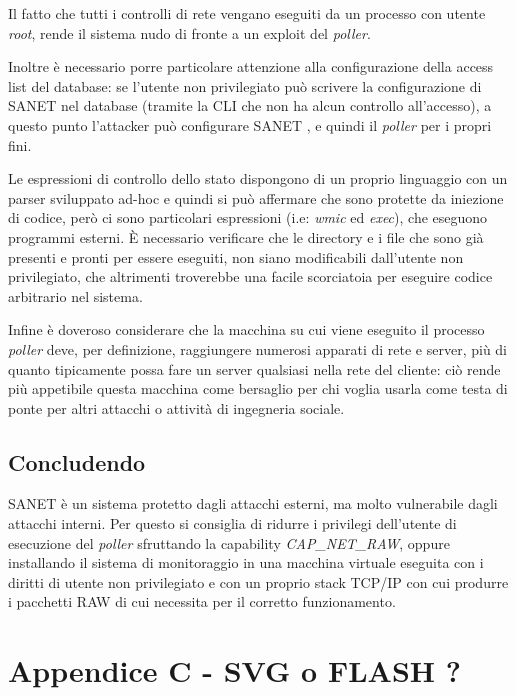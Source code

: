 \documentclass[a4wide,10pt,italian]{manual}
\begin{document}
Il fatto che tutti i controlli di rete vengano eseguiti da un processo con utente \emph{root},
rende il sistema nudo di fronte a un exploit del \emph{poller}.

Inoltre è necessario porre particolare attenzione alla configurazione della access list del database:
se l'utente non privilegiato può scrivere la configurazione di SANET nel database (tramite la CLI che non
ha alcun controllo all'accesso), a questo punto l'attacker può configurare SANET , e quindi il \emph{poller}
per i propri fini.

Le espressioni di controllo dello stato dispongono di un proprio linguaggio con un parser sviluppato ad-hoc
e quindi si può affermare che sono protette da iniezione di codice, però ci sono particolari espressioni (i.e: \emph{wmic} ed \emph{exec}),
che eseguono programmi esterni. È necessario verificare che le directory e i file che sono già presenti e pronti
per essere eseguiti, non siano modificabili dall'utente non privilegiato, che altrimenti troverebbe una facile scorciatoia
per eseguire codice arbitrario nel sistema.

Infine è doveroso considerare che la macchina su cui viene eseguito il processo \emph{poller} deve, per definizione,
raggiungere numerosi apparati di rete e server, più di quanto tipicamente possa fare un server qualsiasi nella rete del cliente:
ciò rende più appetibile questa macchina come bersaglio per chi voglia usarla come testa di ponte per altri attacchi
o attività di ingegneria sociale.


\section{Concludendo}

SANET è un sistema protetto dagli attacchi esterni, ma molto vulnerabile dagli attacchi interni.
Per questo si consiglia di ridurre i privilegi dell'utente di esecuzione del \emph{poller} sfruttando la capability \emph{CAP\_NET\_RAW},
oppure installando il sistema di monitoraggio in una macchina virtuale eseguita con i diritti di utente non privilegiato
e con un proprio stack TCP/IP con cui produrre i pacchetti RAW di cui necessita per il corretto funzionamento.

\resetcurrentobjects
\hypertarget{--doc-appendix/SVG_or_FLASH}{}

\hypertarget{svg-or-flash}{}\chapter{Appendice C - SVG o FLASH ?}
\end{document}
